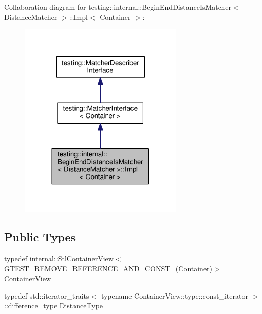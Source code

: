 Collaboration diagram for testing\+:\+:internal\+:\+:Begin\+End\+Distance\+Is\+Matcher$<$ Distance\+Matcher $>$\+:\+:Impl$<$ Container $>$\+:\nopagebreak
\begin{figure}[H]
\begin{center}
\leavevmode
\includegraphics[width=221pt]{classtesting_1_1internal_1_1BeginEndDistanceIsMatcher_1_1Impl__coll__graph}
\end{center}
\end{figure}
\subsection*{Public Types}
\begin{DoxyCompactItemize}
\item 
typedef \hyperlink{classtesting_1_1internal_1_1StlContainerView}{internal\+::\+Stl\+Container\+View}$<$ \hyperlink{gtest-internal_8h_a874567b176266188fabfffb8393267ce}{G\+T\+E\+S\+T\+\_\+\+R\+E\+M\+O\+V\+E\+\_\+\+R\+E\+F\+E\+R\+E\+N\+C\+E\+\_\+\+A\+N\+D\+\_\+\+C\+O\+N\+S\+T\+\_\+}(Container)$>$ \hyperlink{classtesting_1_1internal_1_1BeginEndDistanceIsMatcher_1_1Impl_a5c76ede38c6143430f56e02e9024f535}{Container\+View}
\item 
typedef std\+::iterator\+\_\+traits$<$ typename Container\+View\+::type\+::const\+\_\+iterator $>$\+::difference\+\_\+type \hyperlink{classtesting_1_1internal_1_1BeginEndDistanceIsMatcher_1_1Impl_a10d901c49e2793dae6bcce6fa1a4e9fe}{Distance\+Type}
\end{DoxyCompactItemize}
